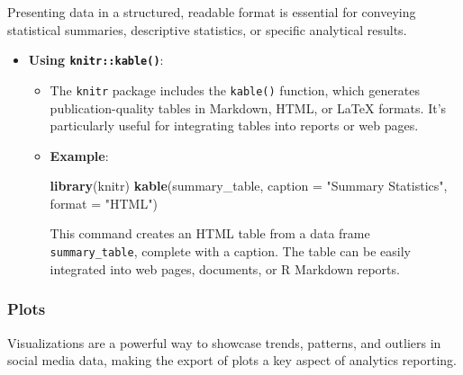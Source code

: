 \documentclass[
]{book}
\newenvironment{Shaded}{\begin{snugshade}}{\end{snugshade}}
\newcommand{\AttributeTok}[1]{\textcolor[rgb]{0.13,0.29,0.53}{#1}}
\newcommand{\FunctionTok}[1]{\textcolor[rgb]{0.13,0.29,0.53}{\textbf{#1}}}
\newcommand{\NormalTok}[1]{#1}
\newcommand{\StringTok}[1]{\textcolor[rgb]{0.31,0.60,0.02}{#1}}
\providecommand{\tightlist}{%
  \setlength{\itemsep}{0pt}\setlength{\parskip}{0pt}}
\begin{document}
Presenting data in a structured, readable format is essential for conveying statistical summaries, descriptive statistics, or specific analytical results.

\begin{itemize}
\tightlist
\item
  \textbf{Using \texttt{knitr::kable()}}:

  \begin{itemize}
  \item
    The \texttt{knitr} package includes the \texttt{kable()} function, which generates publication-quality tables in Markdown, HTML, or LaTeX formats. It's particularly useful for integrating tables into reports or web pages.
  \item
    \textbf{Example}:

\begin{Shaded}
\begin{Highlighting}[]
\FunctionTok{library}\NormalTok{(knitr)}
\FunctionTok{kable}\NormalTok{(summary\_table, }\AttributeTok{caption =} \StringTok{"Summary Statistics"}\NormalTok{, }\AttributeTok{format =} \StringTok{"HTML"}\NormalTok{)}
\end{Highlighting}
\end{Shaded}

    This command creates an HTML table from a data frame \texttt{summary\_table}, complete with a caption. The table can be easily integrated into web pages, documents, or R Markdown reports.
  \end{itemize}
\end{itemize}

\hypertarget{plots-1}{%
\subsubsection{Plots}\label{plots-1}}

Visualizations are a powerful way to showcase trends, patterns, and outliers in social media data, making the export of plots a key aspect of analytics reporting.
\end{document}
